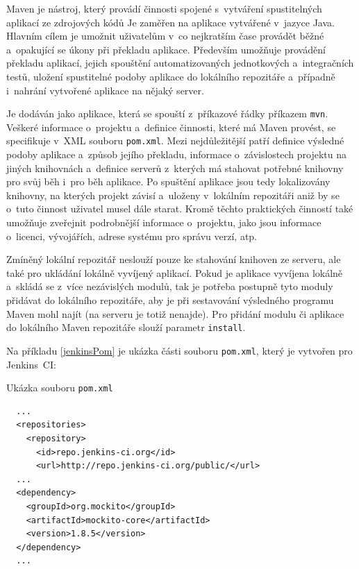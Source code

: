         Maven je nástroj, který provádí činnosti spojené s~vytváření spustitelných aplikací ze zdrojových kódů 
        Je zaměřen na aplikace vytvářené v~jazyce Java. Hlavním cílem je umožnit uživatelům v~co nejkratším
        čase provádět běžné a~opakující se úkony při překladu aplikace. Především umožňuje
        provádění překladu aplikací, jejich spouštění automatizovaných jednotkových
a~integračních testů, uložení spustitelné podoby aplikace do lokálního repozitáře 
        a~případně i~nahrání vytvořené aplikace na nějaký server. 

        Je dodáván jako aplikace, která se spouští z~příkazové řádky příkazem \texttt{mvn}. Veškeré
        informace o~projektu a~definice činnosti, které má Maven provést, se specifikuje 
        v~XML souboru \texttt{pom.xml}. Mezi nejdůležitější patří definice výsledné podoby aplikace
        a~způsob jejího překladu, informace o~závislostech
        projektu na jiných knihovnách a~definice serverů z~kterých má stahovat potřebné knihovny pro svůj 
        běh i~pro běh aplikace. Po spuštění aplikace jsou tedy lokalizovány knihovny, na kterých projekt
        závisí a~uloženy v~lokálním repozitáři aniž by se o~tuto činnost uživatel musel dále starat.
        Kromě těchto praktických činností také umožňuje zveřejnit podrobnější informace o~projektu,         
        jako jsou informace o~licenci, vývojářích, adrese systému pro správu verzí, atp.

        Zmíněný lokální repozitář neslouží pouze ke stahování knihoven ze serveru, ale
        také pro ukládání lokálně vyvíjený aplikací.
        Pokud je aplikace vyvíjena lokálně a~skládá se z~více nezávislých modulů, tak je potřeba
        postupně tyto moduly přidávat do lokálního repozitáře, aby je při sestavování
        výsledného programu Maven mohl najít (na serveru je totiž nenajde). Pro přidání modulu či aplikace do 
        lokálního Maven repozitáře slouží parametr \texttt{install}.


        Na příkladu \ref{jenkinsPom} je ukázka části souboru \texttt{pom.xml}, který je vytvořen pro Jenkins~CI:
        \begin{priklad} \label{jenkinsPom} 
            Ukázka souboru \texttt{pom.xml}
\begin{verbatim}
  ...
  <repositories>
    <repository>
      <id>repo.jenkins-ci.org</id>
      <url>http://repo.jenkins-ci.org/public/</url>
  ...
  <dependency>
    <groupId>org.mockito</groupId>
    <artifactId>mockito-core</artifactId>
    <version>1.8.5</version>
  </dependency>
  ...
\end{verbatim}
        \end{priklad}


